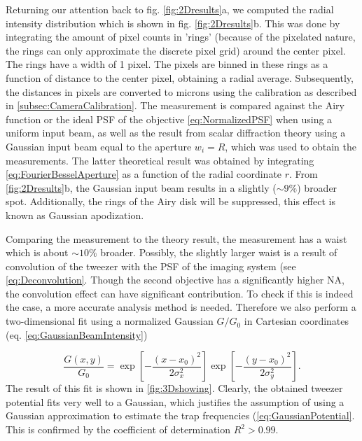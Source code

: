 Returning our attention back to fig. \ref{fig:2Dresults}a, we computed the radial intensity distribution which is shown in fig. \ref{fig:2Dresults}b.
This was done by integrating the amount of pixel counts in 'rings' (because of the pixelated nature, the rings can only approximate the discrete pixel grid) around the center pixel.
The rings have a width of 1 pixel.
The pixels are binned in these rings as a function of distance to the center pixel, obtaining a radial average. 
Subsequently, the distances in pixels are converted to microns using the calibration as described in \cref{subsec:CameraCalibration}.
The measurement is compared against the Airy function or the ideal \ac{PSF} of the objective \cref{eq:NormalizedPSF} when using a uniform input beam, as well as the result from scalar diffraction theory using a Gaussian input beam equal to the aperture $w_i = R$, which was used to obtain the measurements.
The latter theoretical result was obtained by integrating \cref{eq:FourierBesselAperture} as a function of the radial coordinate $r$.
From \ref{fig:2Dresults}b, the Gaussian input beam results in a slightly ($\sim 9\%$) broader spot.
Additionally, the rings of the Airy disk will be suppressed, this effect is known as Gaussian apodization.

Comparing the measurement to the theory result, the measurement has a waist which is about $\sim 10\%$ broader. 
Possibly, the slightly larger waist is a result of convolution of the tweezer with the \ac{PSF} of the imaging system (see \cref{eq:Deconvolution}. Though the second objective has a significantly higher NA, the convolution effect can have significant contribution.
To check if this is indeed the case, a more accurate analysis method is needed.
Therefore we also perform a two-dimensional fit using a normalized Gaussian $G/G_0$ in Cartesian coordinates (eq. \ref{eq:GaussianBeamIntensity})

\begin{equation}\label{eq:2DGaussian}
    \frac{G(x,y)}{G_0} =  
    \exp{\left[ -\frac{(x-x_0)^2}{2\sigma_x^2}\right]}
    \exp{\left[ -\frac{(y-x_0)^2}{2\sigma_y^2}\right]}.
\end{equation}
The result of this fit is shown in \cref{fig:3Dshowing}. 
Clearly, the obtained tweezer potential fits very well to a Gaussian, which justifies the assumption of using a Gaussian approximation to estimate the trap frequencies (\cref{eq:GaussianPotential}. 
This is confirmed by the coefficient of determination $R^2 > 0.99$.

